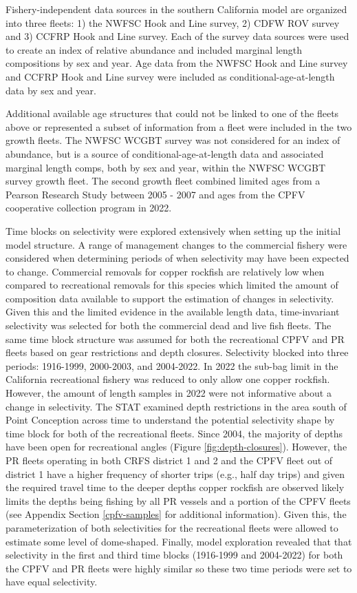 \documentclass[11pt,
  english,
  letterpaper,
]{article}
\begin{document}
Fishery-independent data sources in the southern California model are organized into three fleets: 1) the NWFSC Hook and Line survey, 2) CDFW ROV survey and 3) CCFRP Hook and Line survey. Each of the survey data sources were used to create an index of relative abundance and included marginal length compositions by sex and year. Age data from the NWFSC Hook and Line survey and CCFRP Hook and Line survey were included as conditional-age-at-length data by sex and year.

Additional available age structures that could not be linked to one of the fleets above or represented a subset of information from a fleet were included in the two growth fleets. The NWFSC WCGBT survey was not considered for an index of abundance, but is a source of conditional-age-at-length data and associated marginal length comps, both by sex and year, within the NWFSC WCGBT survey growth fleet. The second growth fleet combined limited ages from a Pearson Research Study between 2005 - 2007 and ages from the CPFV cooperative collection program in 2022.

Time blocks on selectivity were explored extensively when setting up the initial model structure. A range of management changes to the commercial fishery were considered when determining periods of when selectivity may have been expected to change. Commercial removals for copper rockfish are relatively low when compared to recreational removals for this species which limited the amount of composition data available to support the estimation of changes in selectivity. Given this and the limited evidence in the available length data, time-invariant selectivity was selected for both the commercial dead and live fish fleets. The same time block structure was assumed for both the recreational CPFV and PR fleets based on gear restrictions and depth closures. Selectivity blocked into three periods: 1916-1999, 2000-2003, and 2004-2022. In 2022 the sub-bag limit in the California recreational fishery was reduced to only allow one copper rockfish. However, the amount of length samples in 2022 were not informative about a change in selectivity. The STAT examined depth restrictions in the area south of Point Conception across time to understand the potential selectivity shape by time block for both of the recreational fleets. Since 2004, the majority of depths have been open for recreational angles (Figure \ref{fig:depth-closures}). However, the PR fleets operating in both CRFS district 1 and 2 and the CPFV fleet out of district 1 have a higher frequency of shorter trips (e.g., half day trips) and given the required travel time to the deeper depths copper rockfish are observed likely limits the depths being fishing by all PR vessels and a portion of the CPFV fleets (see Appendix Section \ref{cpfv-samples} for additional information). Given this, the parameterization of both selectivities for the recreational fleets were allowed to estimate some level of dome-shaped. Finally, model exploration revealed that that selectivity in the first and third time blocks (1916-1999 and 2004-2022) for both the CPFV and PR fleets were highly similar so these two time periods were set to have equal selectivity.
\end{document}
